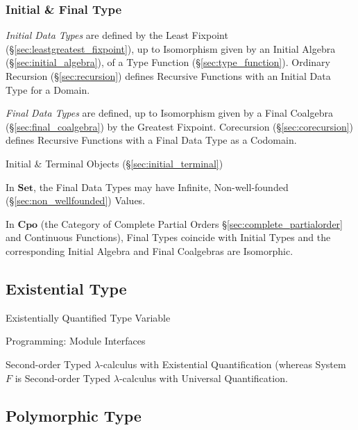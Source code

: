 \subsubsection{Initial \& Final Type}\label{sec:initial_final_type}

\emph{Initial Data Types} are defined by the Least Fixpoint
(\S\ref{sec:leastgreatest_fixpoint}), up to Isomorphism given by an
Initial Algebra (\S\ref{sec:initial_algebra}), of a Type Function
(\S\ref{sec:type_function}). Ordinary Recursion
(\S\ref{sec:recursion}) defines Recursive Functions with an Initial
Data Type for a Domain.

\emph{Final Data Types} are defined, up to Isomorphism given by a
Final Coalgebra (\S\ref{sec:final_coalgebra}) by the Greatest
Fixpoint. Corecursion (\S\ref{sec:corecursion}) defines Recursive
Functions with a Final Data Type as a Codomain.

Initial \& Terminal Objects (\S\ref{sec:initial_terminal})

In $\mathbf{Set}$, the Final Data Types may have Infinite,
Non-well-founded (\S\ref{sec:non_wellfounded}) Values.

In $\mathbf{Cpo}$ (the Category of Complete Partial Orders
\S\ref{sec:complete_partialorder} and Continuous Functions), Final
Types coincide with Initial Types and the corresponding Initial
Algebra and Final Coalgebras are Isomorphic.



\subsection{Existential Type}\label{sec:existential_type}

Existentially Quantified Type Variable

Programming: Module Interfaces

Second-order Typed $\lambda$-calculus with Existential Quantification
(whereas System $F$ is Second-order Typed $\lambda$-calculus with
Universal Quantification.



\subsection{Polymorphic Type}\label{sec:polymorphic_type}

